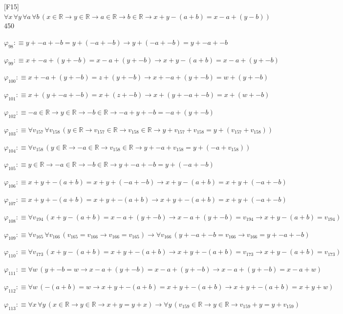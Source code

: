 \begin{fullproof}{[F15]}{$\forall x\,\forall y\,\forall a\,\forall b\,(x \in \mathbb{R} \to y \in \mathbb{R} \to a \in \mathbb{R} \to b \in \mathbb{R} \to x + y - (a + b) = x - a + (y - b))$}{450}
\begin{abbrevlist}
\item $\varphi_{98} :\equiv y + -a + -b = y + (-a + -b) \to y + (-a + -b) = y + -a + -b$
\item $\varphi_{99} :\equiv x + -a + (y + -b) = x - a + (y + -b) \to x + y - (a + b) = x - a + (y + -b)$
\item $\varphi_{100} :\equiv x + -a + (y + -b) = z + (y + -b) \to x + -a + (y + -b) = w + (y + -b)$
\item $\varphi_{101} :\equiv x + (y + -a + -b) = x + (z + -b) \to x + (y + -a + -b) = x + (w + -b)$
\item $\varphi_{102} :\equiv -a \in \mathbb{R} \to y \in \mathbb{R} \to -b \in \mathbb{R} \to -a + y + -b = -a + (y + -b)$
\item $\varphi_{103} :\equiv \forall v_{157}\,\forall v_{158}\,(y \in \mathbb{R} \to v_{157} \in \mathbb{R} \to v_{158} \in \mathbb{R} \to y + v_{157} + v_{158} = y + (v_{157} + v_{158}))$
\item $\varphi_{104} :\equiv \forall v_{158}\,(y \in \mathbb{R} \to -a \in \mathbb{R} \to v_{158} \in \mathbb{R} \to y + -a + v_{158} = y + (-a + v_{158}))$
\item $\varphi_{105} :\equiv y \in \mathbb{R} \to -a \in \mathbb{R} \to -b \in \mathbb{R} \to y + -a + -b = y + (-a + -b)$
\item $\varphi_{106} :\equiv x + y + -(a + b) = x + y + (-a + -b) \to x + y - (a + b) = x + y + (-a + -b)$
\item $\varphi_{107} :\equiv x + y + -(a + b) = x + y + -(a + b) \to x + y + -(a + b) = x + y + (-a + -b)$
\item $\varphi_{108} :\equiv \forall v_{194}\,(x + y - (a + b) = x - a + (y + -b) \to x - a + (y + -b) = v_{194} \to x + y - (a + b) = v_{194})$
\item $\varphi_{109} :\equiv \forall v_{165}\,\forall v_{166}\,(v_{165} = v_{166} \to v_{166} = v_{165}) \to \forall v_{166}\,(y + -a + -b = v_{166} \to v_{166} = y + -a + -b)$
\item $\varphi_{110} :\equiv \forall v_{173}\,(x + y - (a + b) = x + y + -(a + b) \to x + y + -(a + b) = v_{173} \to x + y - (a + b) = v_{173})$
\item $\varphi_{111} :\equiv \forall w\,(y + -b = w \to x - a + (y + -b) = x - a + (y + -b) \to x - a + (y + -b) = x - a + w)$
\item $\varphi_{112} :\equiv \forall w\,(-(a + b) = w \to x + y + -(a + b) = x + y + -(a + b) \to x + y + -(a + b) = x + y + w)$
\item $\varphi_{113} :\equiv \forall x\,\forall y\,(x \in \mathbb{R} \to y \in \mathbb{R} \to x + y = y + x) \to \forall y\,(v_{159} \in \mathbb{R} \to y \in \mathbb{R} \to v_{159} + y = y + v_{159})$

\end{abbrevlist}
\end{fullproof}
